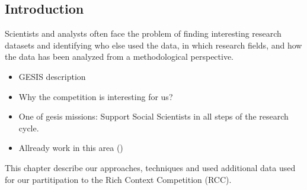 \subsection {Introduction}
Scientists and analysts often face the problem of finding interesting research datasets and identifying who else used the data, in which research fields, and how the data has been analyzed from a methodological perspective.
\begin{itemize}
    \item GESIS description
    \item Why the competition is interesting for us?
    \item One of gesis missions: Support Social Scientists in all steps of the research cycle.
    \item Allready work in this area (\cite{boland2012identifying})
\end{itemize}
This chapter describe our approaches, techniques and used additional data used for our partitipation to the Rich Context Competition (RCC).



